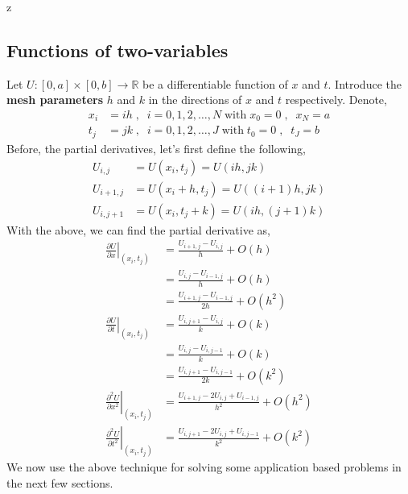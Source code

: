 z\documentclass[a4paper,12pt,twoside]{book}
\newcommand{\pder}[2]{\frac{\partial #1}{\partial #2}}
\begin{document}
\subsection{Functions of two-variables}
Let $U : [0,a]\times[0,b]\to \mathbb{R}$ be a differentiable function of $x$ and $t$. Introduce the \textbf{mesh parameters} $h$ and $k$ in the directions of $x$ and $t$ respectively. Denote,
\begin{equation}
    \begin{split}
        x_i &= ih \;,\;\;i=0,1,2,\dots,N\;\text{with}\;x_0 = 0\;,\;\;x_N = a\\
         t_j &= jk \;,\;\;i=0,1,2,\dots,J\;\text{with}\;t_0 = 0\;,\;\;t_J = b
    \end{split}
\end{equation}
Before, the partial derivatives, let's first define the following,
\begin{equation}
    \begin{split}
        U_{i,j} &= U(x_i,t_j) = U(ih,jk)\\
        U_{i+1,j} &= U(x_i+h,t_j) = U((i+1)h, jk)\\
        U_{i,j+1} &= U(x_i,t_j + k) = U(ih, (j+1)k)
    \end{split}
\end{equation}
With the above, we can find the partial derivative as,
\begin{equation}
    \begin{split}
        \left. \pder{U}{x}\right\vert_{(x_i,t_j)} &= \frac{U_{i+1,j} - U_{i,j}}{h} + O(h)\\
        &= \frac{U_{i,j} - U_{i-1,j}}{h} + O(h)\\
        &= \frac{U_{i+1,j} - U_{i-1,j}}{2h} + O(h^2)\\
         \left. \pder{U}{t}\right\vert_{(x_i,t_j)} &= \frac{U_{i,j+1} - U_{i,j}}{k} + O(k)\\
        &= \frac{U_{i,j} - U_{i,j-1}}{k} + O(k)\\
        &= \frac{U_{i,j+1} - U_{i,j-1}}{2k} + O(k^2)\\
        \left. \pder{^2 U}{x^2}\right\vert_{(x_i,t_j)} &= \frac{U_{i+1,j}-2U_{i,j} + U_{i-1,j}}{h^2} + O(h^2)\\
        \left. \pder{^2 U}{t^2}\right\vert_{(x_i,t_j)} &= \frac{U_{i,j+1}-2U_{i,j} + U_{i,j-1}}{k^2} + O(k^2)
    \end{split}
\end{equation}
We now use the above technique for solving some application based problems in the next few sections.
\end{document}
